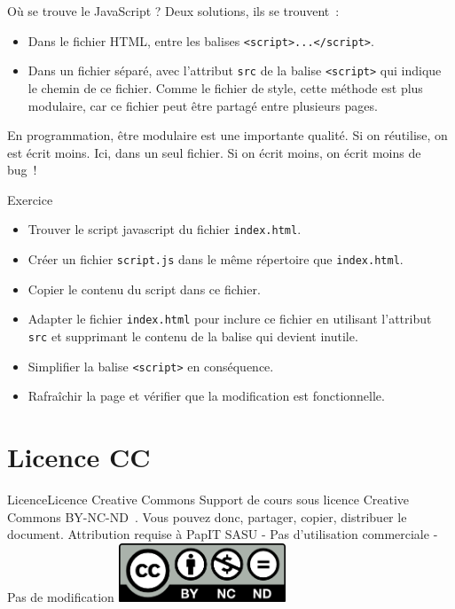 \documentclass{beamer}
\begin{document}
    \begin{frame}{Où se trouve le JavaScript ?}
        Deux solutions, ils se trouvent~:
        \begin{itemize}
            \item Dans le fichier HTML, entre les balises \lstinline{<script>...</script>}.
            \item Dans un fichier séparé, avec l'attribut \lstinline{src} de la balise \lstinline{<script>} qui indique le chemin de ce fichier.
            Comme le fichier de style, cette méthode est plus modulaire, car ce fichier peut être partagé entre plusieurs pages.
        \end{itemize}
        \bigbreak
        \begin{dangercolorbox}
            En programmation, être modulaire est une importante qualité. Si on réutilise, on est écrit moins.
            Ici, dans un seul fichier.
            Si on écrit moins, on écrit moins de bug~!
        \end{dangercolorbox}
    \end{frame}

    \begin{frame}{Exercice \execcounterdispinc{}}
        \begin{itemize}
            \item Trouver le script javascript du fichier \lstinline{index.html}.
            \item Créer un fichier \lstinline{script.js} dans le même répertoire que \lstinline{index.html}.
            \item Copier le contenu du script dans ce fichier.
            \item Adapter le fichier \lstinline{index.html} pour inclure ce fichier en utilisant l'attribut \lstinline{src} et supprimant le contenu de la balise qui devient inutile.
            \item Simplifier la balise \lstinline{<script>} en conséquence.
            \item Rafraîchir la page et vérifier que la modification est fonctionnelle.
        \end{itemize}
    \end{frame}


    \section{Licence CC}\label{sec:licence}

    \begin{frame}{Licence}{Licence Creative Commons}
        Support de cours sous licence Creative Commons BY-NC-ND~.
        \bigbreak
        Vous pouvez donc, partager, copier, distribuer le document.
        \bigbreak
        Attribution requise à PapIT SASU - Pas d’utilisation commerciale - Pas de modification
        \bigbreak
        \centering
        \includegraphics[width=5cm]{image/by-nc-nd-logo}
    \end{frame}
\end{document}
